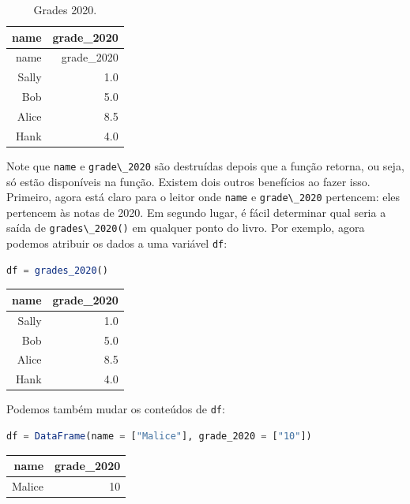 \documentclass[
  notoc %
]{tufte-book}
\newcommand{\passthrough}[1]{#1}
\begin{document}
\hypertarget{tbl:grades_2020}{}
\begin{longtable}[]{@{}rr@{}}
\caption{\label{tbl:grades_2020}Grades 2020.}\tabularnewline
\toprule
name & grade\_2020 \\
\midrule
\endfirsthead
\toprule
name & grade\_2020 \\
\midrule
\endhead
Sally & 1.0 \\
Bob & 5.0 \\
Alice & 8.5 \\
Hank & 4.0 \\
\bottomrule
\end{longtable}

Note que \passthrough{\lstinline!name!} e
\passthrough{\lstinline!grade\_2020!} são destruídas depois que a função
retorna, ou seja, só estão disponíveis na função. Existem dois outros
benefícios ao fazer isso. Primeiro, agora está claro para o leitor onde
\passthrough{\lstinline!name!} e \passthrough{\lstinline!grade\_2020!}
pertencem: eles pertencem às notas de 2020. Em segundo lugar, é fácil
determinar qual seria a saída de
\passthrough{\lstinline!grades\_2020()!} em qualquer ponto do livro. Por
exemplo, agora podemos atribuir os dados a uma variável
\passthrough{\lstinline!df!}:

\begin{lstlisting}[language=Julia]
df = grades_2020()
\end{lstlisting}

\begin{longtable}[]{@{}rr@{}}
\toprule
name & grade\_2020 \\
\midrule
\endhead
Sally & 1.0 \\
Bob & 5.0 \\
Alice & 8.5 \\
Hank & 4.0 \\
\bottomrule
\end{longtable}

Podemos também mudar os conteúdos de \passthrough{\lstinline!df!}:

\begin{lstlisting}[language=Julia]
df = DataFrame(name = ["Malice"], grade_2020 = ["10"])
\end{lstlisting}

\begin{longtable}[]{@{}rr@{}}
\toprule
name & grade\_2020 \\
\midrule
\endhead
Malice & 10 \\
\bottomrule
\end{longtable}
\end{document}
